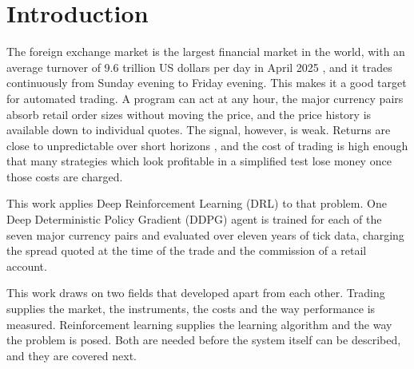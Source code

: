 \section{Introduction}
\label{Section:Introduction}

The foreign exchange market is the largest financial market in the world, with an average turnover of 9.6 trillion US dollars per day in April 2025 \cite{bis_otc_2025}, and it trades continuously from Sunday evening to Friday evening. This makes it a good target for automated trading. A program can act at any hour, the major currency pairs absorb retail order sizes without moving the price, and the price history is available down to individual quotes. The signal, however, is weak. Returns are close to unpredictable over short horizons \cite{fama_efficient_1970}, and the cost of trading is high enough that many strategies which look profitable in a simplified test lose money once those costs are charged.

This work applies Deep Reinforcement Learning (DRL) to that problem. One Deep Deterministic Policy Gradient (DDPG) \cite{lillicrap_continuous_2015} agent is trained for each of the seven major currency pairs and evaluated over eleven years of tick data, charging the spread quoted at the time of the trade and the commission of a retail account.











This work draws on two fields that developed apart from each other. Trading supplies the market, the instruments, the costs and the way performance is measured. Reinforcement learning supplies the learning algorithm and the way the problem is posed. Both are needed before the system itself can be described, and they are covered next.